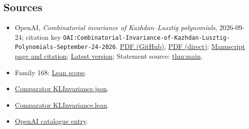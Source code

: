 \documentclass[11pt]{article}
\begin{document}
\subsection{Sources}
\begin{itemize}
\item OpenAI, \emph{Combinatorial invariance of Kazhdan–Lusztig polynomials}, 2026-09-24; citation key \texttt{OAI:Combinatorial-Invariance-of-Kazhdan-Lusztig-Polynomials-September-24-2026}. \href{https://github.com/openai/math/blob/adc7f1241b42e322a6451854ab7e4b4c146bf78a/preprints/Combinatorial-Invariance-of-Kazhdan-Lusztig-Polynomials-September-24-2026/paper.pdf}{PDF (GitHub)}; \href{https://github.com/openai/math/raw/adc7f1241b42e322a6451854ab7e4b4c146bf78a/preprints/Combinatorial-Invariance-of-Kazhdan-Lusztig-Polynomials-September-24-2026/paper.pdf}{PDF (direct)}; \href{https://github.com/openai/math/blob/adc7f1241b42e322a6451854ab7e4b4c146bf78a/preprints/Combinatorial-Invariance-of-Kazhdan-Lusztig-Polynomials-September-24-2026/README.md}{Manuscript page and citation}; \href{https://github.com/openai/math/blob/main/preprints/Combinatorial-Invariance-of-Kazhdan-Lusztig-Polynomials-September-24-2026/paper.pdf}{Latest version}; Statement source: \href{https://github.com/openai/math/blob/adc7f1241b42e322a6451854ab7e4b4c146bf78a/preprints/Combinatorial-Invariance-of-Kazhdan-Lusztig-Polynomials-September-24-2026/build/01-introduction.tex\#L22}{thm:main}.
\item Family 168: \href{https://github.com/openai/math/blob/adc7f1241b42e322a6451854ab7e4b4c146bf78a/lean/docs/168.md}{Lean scope}.
\item \href{https://github.com/openai/math/blob/adc7f1241b42e322a6451854ab7e4b4c146bf78a/lean/ComparatorChallenges/KLInvariance.json}{Comparator KLInvariance.json}.
\item \href{https://github.com/openai/math/blob/adc7f1241b42e322a6451854ab7e4b4c146bf78a/lean/ComparatorChallenges/KLInvariance.lean}{Comparator KLInvariance.lean}.
\item \href{https://github.com/openai/math/blob/adc7f1241b42e322a6451854ab7e4b4c146bf78a/CONTENTS.md}{OpenAI catalogue entry}.
\end{itemize}
\end{document}
